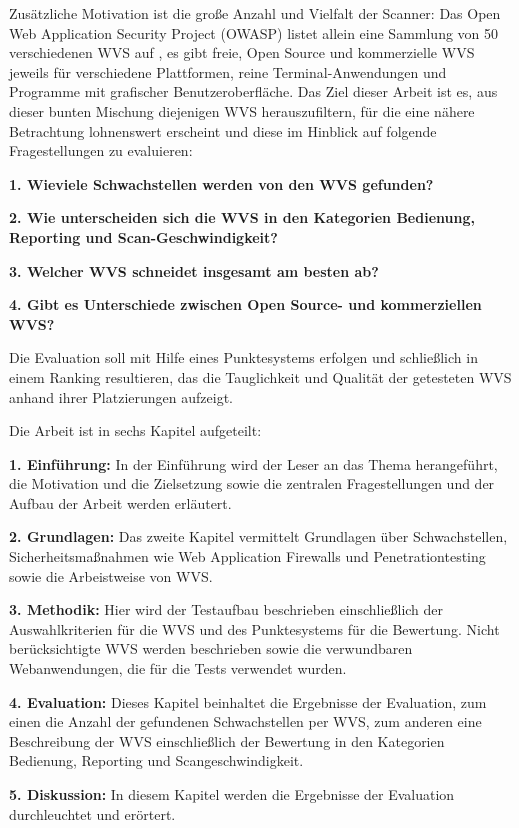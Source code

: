 \documentclass[12pt,oneside,a4paper,parskip]{scrbook}
\begin{document}
Zusätzliche Motivation ist die große Anzahl und Vielfalt der Scanner: Das Open Web Application Security Project (OWASP) listet allein eine Sammlung von 50 verschiedenen WVS auf \cite{OWASPtools}, es gibt freie, Open Source und kommerzielle WVS jeweils für verschiedene Plattformen, reine Terminal-Anwendungen und Programme mit grafischer Benutzeroberfläche.
Das Ziel dieser Arbeit ist es, aus dieser bunten Mischung diejenigen WVS herauszufiltern, für die eine nähere Betrachtung lohnenswert erscheint und diese im Hinblick auf folgende Fragestellungen zu evaluieren:

\textbf{1. Wieviele Schwachstellen werden von den WVS gefunden?}

\textbf{2. Wie unterscheiden sich die WVS in den Kategorien Bedienung, Reporting und Scan-Geschwindigkeit?}

\textbf{3. Welcher WVS schneidet insgesamt am besten ab?}

\textbf{4. Gibt es Unterschiede zwischen Open Source- und kommerziellen WVS?}

Die Evaluation soll mit Hilfe eines Punktesystems erfolgen und schließlich in einem Ranking resultieren, das die Tauglichkeit und Qualität der getesteten WVS anhand ihrer Platzierungen aufzeigt.

Die Arbeit ist in sechs Kapitel aufgeteilt:

\textbf{1. Einführung:} In der Einführung wird der Leser an das Thema herangeführt, die Motivation und die Zielsetzung  sowie die zentralen Fragestellungen und der Aufbau der Arbeit werden erläutert.

\textbf{2. Grundlagen:} Das zweite Kapitel vermittelt Grundlagen über Schwachstellen, Sicherheitsmaßnahmen wie Web Application Firewalls und Penetrationtesting sowie die Arbeistweise von WVS.

\textbf{3. Methodik:} Hier wird der Testaufbau beschrieben einschließlich der Auswahlkriterien für die WVS und des Punktesystems für die Bewertung. Nicht berücksichtigte WVS werden beschrieben sowie die verwundbaren Webanwendungen, die für die Tests verwendet wurden.

\textbf{4. Evaluation:} Dieses Kapitel beinhaltet die Ergebnisse der Evaluation, zum einen die Anzahl der gefundenen Schwachstellen per WVS, zum anderen eine Beschreibung der WVS einschließlich der Bewertung in den Kategorien Bedienung, Reporting und Scangeschwindigkeit.

\textbf{5. Diskussion:} In diesem Kapitel werden die Ergebnisse der Evaluation durchleuchtet und erörtert.
\end{document}
